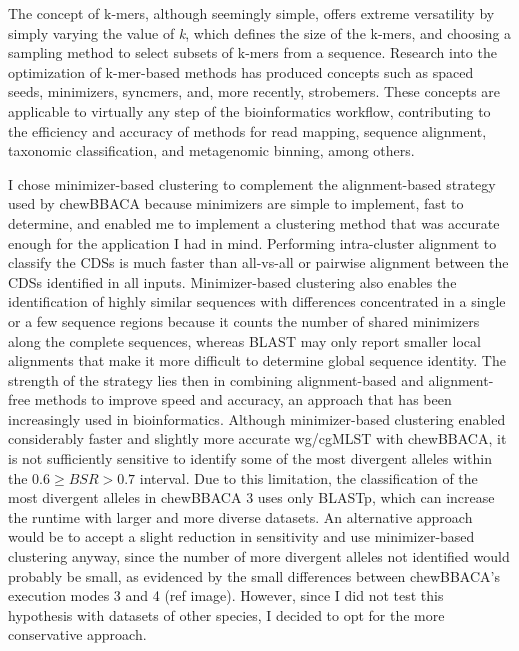 The concept of k-mers, although seemingly simple, offers extreme versatility by simply varying the value of \textit{k}, which defines the size of the k-mers, and choosing a sampling method to select subsets of k-mers from a sequence. Research into the optimization of k-mer-based methods has produced concepts such as spaced seeds, minimizers, syncmers, and, more recently, strobemers. These concepts are applicable to virtually any step of the bioinformatics workflow, contributing to the efficiency and accuracy of methods for read mapping, sequence alignment, taxonomic classification, and metagenomic binning, among others.

I chose minimizer-based clustering to complement the alignment-based strategy used by chewBBACA because minimizers are simple to implement, fast to determine, and enabled me to implement a clustering method that was accurate enough for the application I had in mind. Performing intra-cluster alignment to classify the CDSs is much faster than all-vs-all or pairwise alignment between the CDSs identified in all inputs. Minimizer-based clustering also enables the identification of highly similar sequences with differences concentrated in a single or a few sequence regions because it counts the number of shared minimizers along the complete sequences, whereas BLAST may only report smaller local alignments that make it more difficult to determine global sequence identity. The strength of the strategy lies then in combining alignment-based and alignment-free methods to improve speed and accuracy, an approach that has been increasingly used in bioinformatics. Although minimizer-based clustering enabled considerably faster and slightly more accurate wg/cgMLST with chewBBACA, it is not sufficiently sensitive to identify some of the most divergent alleles within the $0.6\geq BSR > 0.7$ interval. Due to this limitation, the classification of the most divergent alleles in chewBBACA 3 uses only BLASTp, which can increase the runtime with larger and more diverse datasets. An alternative approach would be to accept a slight reduction in sensitivity and use minimizer-based clustering anyway, since the number of more divergent alleles not identified would probably be small, as evidenced by the small differences between chewBBACA's execution modes 3 and 4 (ref image). However, since I did not test this hypothesis with datasets of other species, I decided to opt for the more conservative approach.

